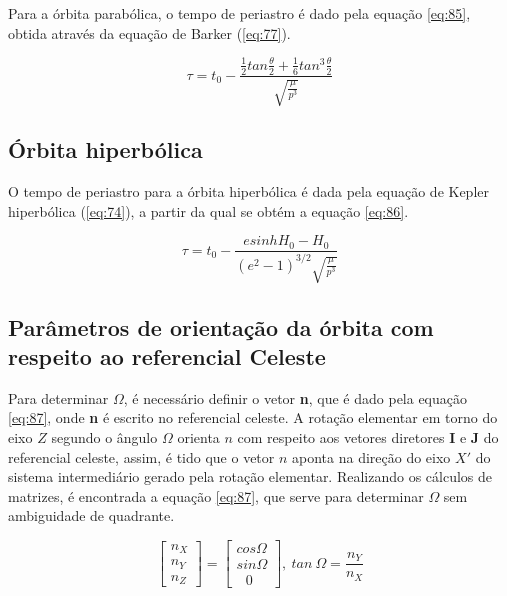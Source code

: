 Para a órbita parabólica, o tempo de periastro é dado pela equação \ref{eq:85}, obtida através da equação de Barker (\ref{eq:77}).

\begin{equation}
    \tau = t_{0} - \frac {\frac{1}{2} tan \frac{\theta}{2}+\frac{1}{6}tan^{3}\frac{\theta}{2}}  {\sqrt{\frac{\mu}{p^{3}}}}
    \label{eq:85}
\end{equation}

\subsection{Órbita hiperbólica}

O tempo de periastro para a órbita hiperbólica é dada pela equação de Kepler hiperbólica (\ref{eq:74}), a partir da qual se obtém a equação \ref{eq:86}.

\begin{equation}
    \tau = t_{0}-\frac{esinh H_{0}-H_{0} }{(e^{2} - 1)^{3/2} \sqrt{\frac{\mu}{p^{3}}}}
    \label{eq:86}
\end{equation}

\subsection{Parâmetros de orientação da órbita com respeito ao referencial Celeste}

Para determinar $\Omega$, é necessário definir o vetor \textbf{n}, que é dado pela equação \ref{eq:87}, onde \textbf{n} é escrito no referencial celeste. A rotação elementar em torno do eixo $Z$ segundo o ângulo $\Omega$ orienta $n$ com respeito aos vetores diretores \textbf{I} e \textbf{J} do referencial celeste, assim, é tido que o vetor $n$ aponta na direção do eixo $X'$ do sistema intermediário gerado pela rotação elementar. Realizando os cálculos de matrizes, é encontrada a equação \ref{eq:87}, que serve para determinar $\Omega$ sem ambiguidade de quadrante.

\begin{equation}
\left[\begin{array}{l}
n_{X} \\
n_{Y}  \\
n_{Z} 
\end{array}\right] = 
\left[\begin{array}{l}
cos\Omega \\
sin\Omega \\
\  \ \ 0
\end{array}\right] , \ tan \ \Omega = \frac{n_{Y}}{n_{X}}
\label{eq:87}
\end{equation}

